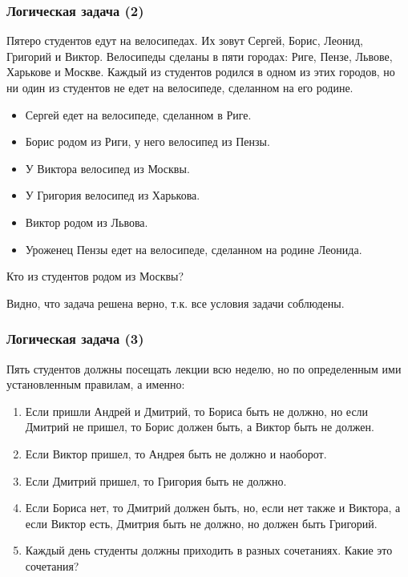 \subsubsection{Логическая задача (2)}

Пятеро студентов едут на велосипедах. Их зовут Сергей, Борис, Леонид, Григорий и Виктор. Велосипеды сделаны в пяти городах: Риге, Пензе, Львове, Харькове и Москве. Каждый из студентов родился в одном из этих городов, но ни один из студентов не едет на велосипеде, сделанном на его родине.

\begin{itemize}
	\item Сергей едет на велосипеде, сделанном в Риге.
	\item Борис родом из Риги, у него велосипед из Пензы.
	\item У Виктора велосипед из Москвы.
	\item У Григория велосипед из Харькова.
	\item Виктор родом из Львова.
	\item Уроженец Пензы едет на велосипеде, сделанном на родине Леонида.
\end{itemize}

Кто из студентов родом из Москвы?


Видно, что задача решена верно, т.к. все условия задачи соблюдены.

\subsubsection{Логическая задача (3)}

Пять студентов должны посещать лекции всю неделю, но по определенным ими установленным правилам, а именно:

\begin{enumerate}
	\item Если пришли Андрей и Дмитрий, то Бориса быть не должно, но если Дмитрий не пришел, то Борис должен быть, а Виктор быть не должен. 
	\item Если Виктор пришел, то Андрея быть не должно и наоборот. 
	\item Если Дмитрий пришел, то Григория быть не должно. 
	\item Если Бориса нет, то Дмитрий должен быть, но, если нет также и Виктора, а если Виктор есть, Дмитрия быть не должно, но должен быть Григорий. 
	\item Каждый день студенты должны приходить в разных сочетаниях. Какие это сочетания?
\end{enumerate}

